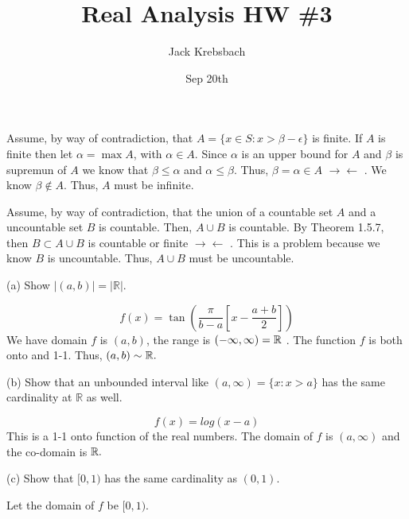\documentclass{report}
\title{Real Analysis HW \#3}
\author{Jack Krebsbach }
\date{Sep 20th}
\newcommand{\contra}{
$\rightarrow\!\leftarrow$
}
\begin{document}
\maketitle


\sol
\begin{myproof}
    
Assume, by way of contradiction, that $A = \{x \in S: x>\beta-\epsilon\}$ is finite. If $A$ is finite then let $\alpha = \max A$, with $\alpha \in A.$ Since $\alpha$ is an upper bound for $A$ and $\beta$ is supremun of $A$ we know that $\beta \leq \alpha$ and $\alpha \leq \beta.$ Thus, $\beta = \alpha \in A$ \contra. We know $\beta \not\in A.$ Thus, $A$ must be infinite.

\end{myproof}
\begin{myproof}
  Assume, by way of contradiction, that the union of a countable set $A$ and a uncountable set $B$ is countable. Then, $A \cup B$ is countable. By Theorem 1.5.7, then $B \subset A \cup B$ is countable or finite \contra. This is a problem because we know $B$ is uncountable. Thus, $A \cup B$ must be uncountable. 

  
\end{myproof}

(a) Show $|(a, b)|=|\mathbb{R}|$. 


\sol
$$
f(x) = \tan\left(\frac{\pi}{b-a}\left[x - \frac{a+b}{2}\right]\right)
$$
We have domain $f$ is $(a,b)$, the range is $(-\infty, \infty) = \RR$ . The function $f$ is both onto and 1-1. Thus, $(a,b) \sim \RR.$

\par \bigskip
(b) Show that an unbounded interval like $(a, \infty)=\{x: x>a\}$ has the same cardinality at $\mathbb{R}$ as well.

\sol
$$
f(x)=log(x-a)
$$
This is a 1-1 onto function of the real numbers. The domain of $f$ is $(a, \infty)$ and the co-domain is $\RR.$

\par \bigskip
(c) Show that $[0,1)$ has the same cardinality as $(0,1)$. 


\bigskip
\sol
Let the domain of $f$ be $[0,1).$
\end{document}
